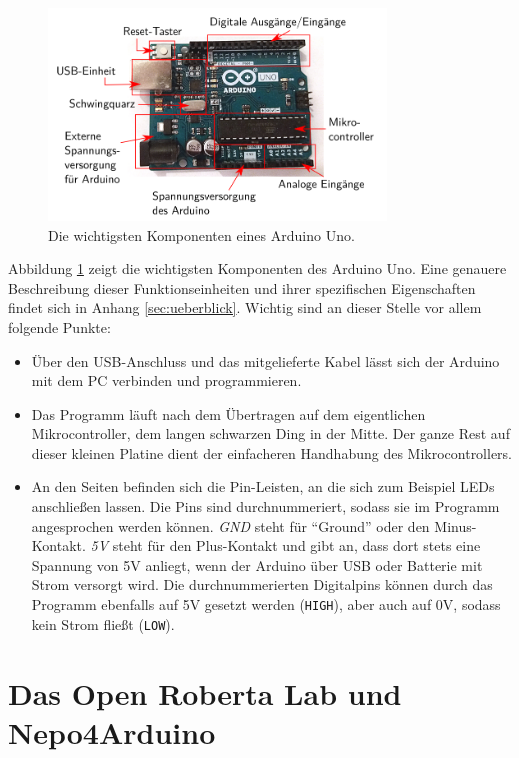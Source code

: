 \begin{figure}[h]
	\centering
	\includegraphics[width=0.8\textwidth]{pics/arduino-beschriftet.png}
	\caption{Die wichtigsten Komponenten eines Arduino Uno.}
	\label{abb:arduino-beschriftet}
\end{figure}

Abbildung \ref{abb:arduino-beschriftet} zeigt die wichtigsten Komponenten des Arduino Uno. Eine genauere Beschreibung dieser Funktionseinheiten und ihrer spezifischen Eigenschaften findet sich in Anhang \ref{sec:ueberblick}. Wichtig sind an dieser Stelle vor allem folgende Punkte:
\begin{itemize}
	\item Über den USB-Anschluss und das mitgelieferte Kabel lässt sich der Arduino mit dem PC verbinden und programmieren.
	\item Das Programm läuft nach dem Übertragen auf dem eigentlichen Mikrocontroller, dem langen schwarzen Ding in der Mitte. Der ganze Rest auf dieser kleinen Platine dient der einfacheren Handhabung des Mikrocontrollers.
	\item An den Seiten befinden sich die Pin-Leisten, an die sich zum Beispiel LEDs anschließen lassen. Die Pins sind durchnummeriert, sodass sie im Programm angesprochen werden können. \emph{GND} steht für \enquote{Ground} oder den Minus-Kontakt. \emph{5V} steht für den Plus-Kontakt und gibt an, dass dort stets eine Spannung von 5V anliegt, wenn der Arduino über USB oder Batterie mit Strom versorgt wird. Die durchnummerierten Digitalpins können durch das Programm ebenfalls auf 5V gesetzt werden (\texttt{HIGH}), aber auch auf 0V, sodass kein Strom fließt (\texttt{LOW}).
\end{itemize}
\vfill

\section{Das Open Roberta Lab und Nepo4Arduino}

